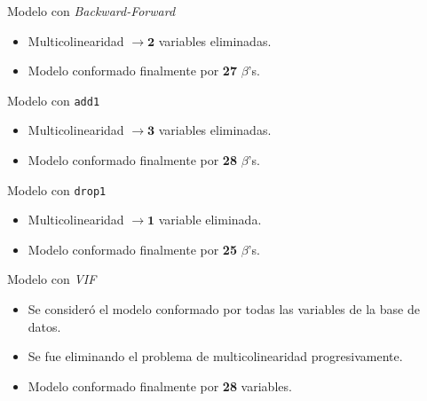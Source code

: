 \documentclass[11pt]{beamer}
\newcommand{\B}{\beta}
\newcommand{\cod}[1]{\texttt{\frenchspacing#1}}
\begin{document}
\begin{frame}{Modelo con \textit{Backward-Forward}}
	\begin{itemize}
		\item Multicolinearidad $\to \mathbf{2}$ variables eliminadas.
		\pause
		\item Modelo conformado finalmente por \textbf{27} $\B$'s.
	\end{itemize}
\end{frame}

\begin{frame}{Modelo con \cod{add1}}
	\begin{itemize}
		\item Multicolinearidad $\to \mathbf{3}$ variables eliminadas.
		\pause
		\item Modelo conformado finalmente por \textbf{28} $\B$'s.
	\end{itemize}
\end{frame}

\begin{frame}{Modelo con \cod{drop1}}
	\begin{itemize}
		\item Multicolinearidad $\to \mathbf{1}$ variable eliminada.
		\pause
		\item Modelo conformado finalmente por \textbf{25} $\B$'s.
	\end{itemize}
\end{frame}

\begin{frame}{Modelo con \textit{VIF}}
	\begin{itemize}
		\item Se consideró el modelo conformado por todas las variables de la base de datos.
		\pause
		\item Se fue eliminando el problema de multicolinearidad progresivamente.
		\pause
		\item Modelo conformado finalmente por \textbf{28} variables.
	\end{itemize}
\end{frame}
\end{document}
